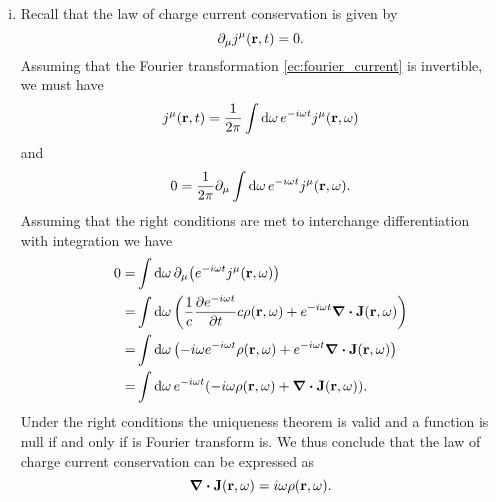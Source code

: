 \documentclass{article}
\begin{document}
\begin{enumerate}[(i)]
\item Recall that the law of charge current conservation is given by
\begin{equation}
\partial_\mu j^\mu(\vb{r},t)=0.
\end{equation}
Assuming that the Fourier transformation \eqref{ec:fourier_current} is invertible, we must have
\begin{equation}
j^\mu(\vb{r},t)=\frac{1}{2\pi}\int\dd{\omega}e^{-i\omega t}j^\mu(\vb{r},\omega)
\end{equation}
and
\begin{equation}
0=\frac{1}{2\pi}\partial_\mu\int\dd{\omega}e^{-i\omega t}j^\mu(\vb{r},\omega).
\end{equation}
Assuming that the right conditions are met to interchange differentiation with integration we have
\begin{align}
\begin{split}
0=&\int\dd{\omega}\partial_\mu\qty(e^{-i\omega t}j^\mu(\vb{r},\omega))\\
=&\int\dd{\omega}\qty(\frac{1}{c}\pdv{e^{-i\omega t}}{t}c\rho(\vb{r},\omega)+e^{-i\omega t}\div{\vb{J}}(\vb{r},\omega))\\
=&\int\dd{\omega}\qty(-i\omega e^{-i\omega t}\rho(\vb{r},\omega)+e^{-i\omega t}\div{\vb{J}}(\vb{r},\omega))\\
=&\int\dd{\omega}e^{-i\omega t}\qty(-i\omega\rho(\vb{r},\omega)+\div{\vb{J}}(\vb{r},\omega)).
\end{split}
\end{align}
Under the right conditions the uniqueness theorem is valid and a function is null if and only if is Fourier transform is. We thus conclude that the law of charge current conservation can be expressed as
\begin{equation}\label{ec:fourier_charge_current}
\div{\vb{J}}(\vb{r},\omega)=i\omega\rho(\vb{r},\omega).
\end{equation}


\end{enumerate}
\end{document}
